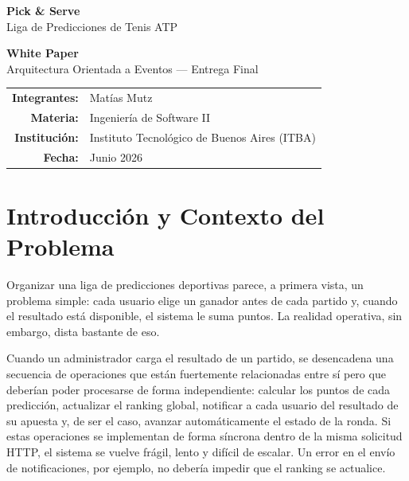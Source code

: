 \documentclass[12pt, a4paper]{article}
\begin{document}
\thispagestyle{empty}
\begin{center}
  \vspace*{1.5cm}
  {\fontsize{28}{34}\selectfont\bfseries\color{brand} Pick \& Serve}\\[0.4cm]
  {\large\color{gray60} Liga de Predicciones de Tenis ATP}\\[2cm]


  \vspace{1.2cm}
  {\LARGE\bfseries White Paper}\\[0.3cm]
  {\large Arquitectura Orientada a Eventos — Entrega Final}\\[2.5cm]

  \begin{tabular}{rl}
    \textbf{Integrantes:} & Matías Mutz\\[0.2cm]
    \textbf{Materia:}     & Ingeniería de Software II\\
    \textbf{Institución:} & Instituto Tecnológico de Buenos Aires (ITBA)\\
    \textbf{Fecha:}       & Junio 2026\\
  \end{tabular}
\end{center}

\newpage
\thispagestyle{empty}
\tableofcontents
\newpage

\section{Introducción y Contexto del Problema}

Organizar una liga de predicciones deportivas parece, a primera vista, un problema simple: cada usuario elige un ganador antes de cada partido y, cuando el resultado está disponible, el sistema le suma puntos. La realidad operativa, sin embargo, dista bastante de eso.

Cuando un administrador carga el resultado de un partido, se desencadena una secuencia de operaciones que están fuertemente relacionadas entre sí pero que deberían poder procesarse de forma independiente: calcular los puntos de cada predicción, actualizar el ranking global, notificar a cada usuario del resultado de su apuesta y, de ser el caso, avanzar automáticamente el estado de la ronda. Si estas operaciones se implementan de forma síncrona dentro de la misma solicitud HTTP, el sistema se vuelve frágil, lento y difícil de escalar. Un error en el envío de notificaciones, por ejemplo, no debería impedir que el ranking se actualice.
\end{document}
